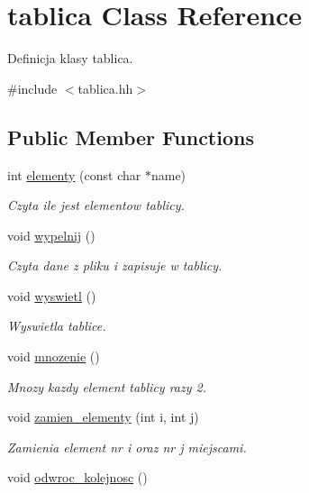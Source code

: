 \hypertarget{classtablica}{\section{tablica \-Class \-Reference}
\label{classtablica}
}


\-Definicja klasy tablica.  




{\ttfamily \#include $<$tablica.\-hh$>$}

\subsection*{\-Public \-Member \-Functions}
\begin{DoxyCompactItemize}
\item 
int \hyperlink{classtablica_a11a5b5b289a911579321b042cbad453b}{elementy} (const char $\ast$name)
\begin{DoxyCompactList}\small\item\em \-Czyta ile jest elementow tablicy. \end{DoxyCompactList}\item 
void \hyperlink{classtablica_a2e787e39230c5bdcfa4a5b853f949021}{wypelnij} ()
\begin{DoxyCompactList}\small\item\em \-Czyta dane z pliku i zapisuje w tablicy. \end{DoxyCompactList}\item 
void \hyperlink{classtablica_a2b47856f4150aa2386a56b4aef8f8f5a}{wyswietl} ()
\begin{DoxyCompactList}\small\item\em \-Wyswietla tablice. \end{DoxyCompactList}\item 
void \hyperlink{classtablica_acb57cdc80f4bea556af98343d280419b}{mnozenie} ()
\begin{DoxyCompactList}\small\item\em \-Mnozy kazdy element tablicy razy 2. \end{DoxyCompactList}\item 
void \hyperlink{classtablica_a26a5a71d013d0284ff0f6b7648444a5e}{zamien\-\_\-elementy} (int i, int j)
\begin{DoxyCompactList}\small\item\em \-Zamienia element nr i oraz nr j miejscami. \end{DoxyCompactList}\item 
void \hyperlink{classtablica_aad3f11f312e1e3205049f5154c70c9e6}{odwroc\-\_\-kolejnosc} ()

\end{DoxyCompactItemize}
